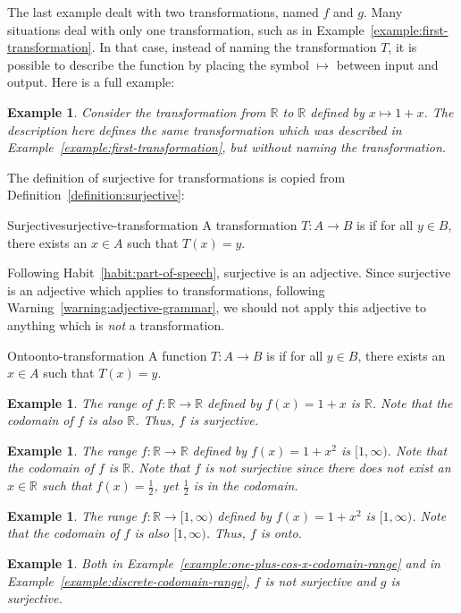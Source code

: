 \documentclass{book}
\newcounter{ekcounter}%
\theoremstyle{ekimcustom}
\newtheorem{example}[ekcounter]{Example}
\newcommand\defn[1]{{\color{blue}{\bf #1}}}
\begin{document}
The last example dealt with two transformations, named $f$ and $g$. Many situations deal with only one transformation, such as in Example~\ref{example:first-transformation}. In that case, instead of naming the transformation $T$, it is possible to describe the function by placing the symbol $\mapsto$ between input and output. Here is a full example:
\begin{example}
Consider the transformation from $\mathbb{R}$ to $\mathbb{R}$ defined by $x \mapsto 1+x$. The description here defines the same transformation which was described in Example~\ref{example:first-transformation}, but without naming the transformation.
\end{example}


The definition of surjective for transformations is copied from Definition~\ref{definition:surjective}:
\begin{bdefinition}{Surjective}{surjective-transformation}
A transformation $T : A \to B$ is \defn{surjective} if for all $y \in B$, there exists an $x \in A$ such that $T(x)=y$.
\end{bdefinition}
Following Habit~\ref{habit:part-of-speech}, surjective is an adjective. Since surjective is an adjective which applies to transformations, following Warning~\ref{warning:adjective-grammar}, we should not apply this adjective to anything which is \emph{not} a transformation.
\begin{bdefinition}{Onto}{onto-transformation}
A function $T : A \to B$ is \defn{onto} if for all $y \in B$, there exists an $x \in A$ such that $T(x)=y$.
\end{bdefinition}

\begin{example}
The range of $f : \mathbb{R} \to \mathbb{R}$ defined by $f(x) = 1 + x$ is $\mathbb{R}$. Note that the codomain of $f$ is also $\mathbb{R}$. Thus, $f$ is surjective.
\end{example}
\begin{example}
The range $f : \mathbb{R} \to \mathbb{R}$ defined by $f(x) = 1 + x^2$ is $[1,\infty)$. Note that the codomain of $f$ is $\mathbb{R}$. Note that $f$ is not surjective since there does not exist an $x \in \mathbb{R}$ such that $f(x)=\frac12$, yet $\frac12$ is in the codomain.
\end{example}
\begin{example}
The range $f : \mathbb{R} \to [1,\infty)$ defined by $f(x) = 1 + x^2$ is $[1,\infty)$. Note that the codomain of $f$ is also $[1,\infty)$. Thus, $f$ is onto.
\end{example}
\begin{example}
Both in Example~\ref{example:one-plus-cos-x-codomain-range} and in Example~\ref{example:discrete-codomain-range}, $f$ is not surjective and $g$ is surjective.
\end{example}
\end{document}
